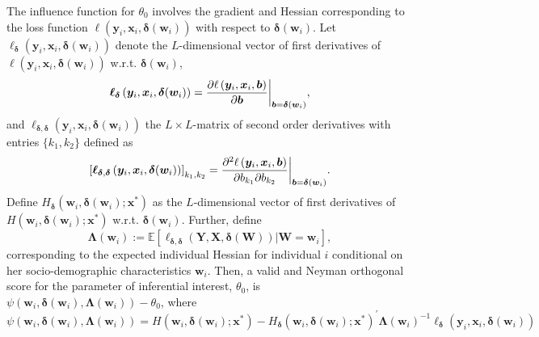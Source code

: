 \documentclass[a4paper, 12pt]{article}
\begin{document}
The influence function for $\theta_0$ involves the gradient and Hessian corresponding to the loss function $\ell\left(\bm{y}_i, \bm{x}_i, \bm{\delta}(\bm{w}_i)\right)$ with respect to $\bm{\delta}(\bm{w}_i)$. Let $\bm{\ell}_{\bm{\delta}}\left(\bm{y}_i, \bm{x}_i, \bm{\delta}(\bm{w}_i)\right)$ denote the $L$-dimensional vector of first derivatives of $\bm{\ell}\left(\bm{y}_i, \bm{x}_i, \bm{\delta}(\bm{w}_i)\right)$ w.r.t. $\bm{\delta}(\bm{w}_i)$,
\begin{equation}
\bm{\ell}_{\bm{\delta}}\left(\bm{y}_i, \bm{x}_i, \bm{\delta}(\bm{w}_i)\right)=\frac{\partial \ell\left(\bm{y}_i, \bm{x}_i, \bm{b}\right)}{\partial\bm{b}}\bigg\vert_{\bm{b}=\bm{\delta}\left(\bm{w}_i\right)}, \notag
\end{equation}
and $\bm{\ell}_{\bm{\delta},\bm{\delta}}\left(\bm{y}_i, \bm{x}_i, \bm{\delta}(\bm{w}_i)\right)$ the $L \times L$-matrix of second order derivatives with entries $\{k_1, k_2\}$ defined as
\begin{equation}
\left[\bm{\ell}_{\bm{\delta},\bm{\delta}}\left(\bm{y}_i, \bm{x}_i, \bm{\delta}(\bm{w}_i)\right)\right]_{k_1,k_2} = \frac{\partial^2 \ell\left(\bm{y}_i, \bm{x}_i, \bm{b}\right)}{\partial b_{k_1}\partial b_{k_2}}\bigg\vert_{\bm{b}=\bm{\delta}\left(\bm{w}_i\right)}.\notag
\end{equation}
Define   $H_{\bm{\delta}}(\bm{w}_i,\bm{\delta}(\bm{w}_i);\bm{x}^*)$ as the $L$-dimensional vector of first derivatives of $H(\bm{w}_i,\bm{\delta}(\bm{w}_i);\bm{x}^*)$ w.r.t. $\bm{\delta}(\bm{w}_i)$. Further, define 
\begin{equation}
\bm{\Lambda}(\bm{w}_i):=\mathbb{E}[\ell_{\bm{\delta},\bm{\delta}}(\bm{Y},\bm{X},\bm{\delta}(\bm{W}))\vert \bm{W}=\bm{w}_i],
\end{equation}
corresponding to the expected individual Hessian for individual $i$ conditional on her socio-demographic characteristics $\bm{w}_i$. 
Then, a valid and Neyman orthogonal score for the parameter of inferential interest, $\theta_0$, is $\psi(\bm{w}_i,\bm{\delta}(\bm{w}_i),\bm{\Lambda}(\bm{w}_i))-\theta_0$, where 
\begin{equation}\label{eqDL:InfluenceFunctionCondLogit}
\psi\left(\bm{w}_i,\bm{\delta}(\bm{w}_i),\bm{\Lambda}(\bm{w}_i)\right)=H\left(\bm{w}_i,\bm{\delta}\left(\bm{w}_i\right);\bm{x}^*\right) - H_{\bm{\delta}}\left(\bm{w}_i,\bm{\delta}\left(\bm{w}_i\right);\bm{x}^*\right)^{\prime}\bm{\Lambda}\left(\bm{w}_i\right)^{-1}\bm{\ell}_{\bm{\delta}}\left(\bm{y}_i,\bm{x}_i,\bm{\delta}(\bm{w}_i)\right)
\end{equation} 
\end{document}
